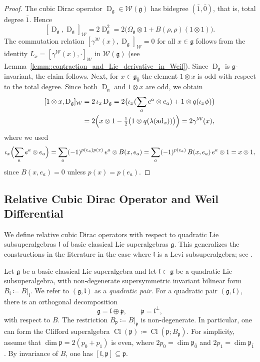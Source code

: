 \documentclass[11pt]{amsart}
\newcommand{\ad}{\operatorname{ad}}
\newcommand{\Dirac}{\operatorname{D}}
\def\WW{{\mathcal{W}}}
\def\Cl{{\operatorname{Cl}}}
\def\pp{{\mathfrak p}}
\def\ll{{\mathfrak l}}
\def\even{{\mathfrak{g}_{\bar{0}}}}
\def\pp{{\mathfrak p}}
\def\pp{{\mathfrak{p}}}
\def\gg{{\mathfrak{g}}}
\theoremstyle{plain}
\theoremstyle{remark}
\theoremstyle{definition}
\numberwithin{equation}{section}
\theoremstyle{remark}
\begin{document}
\begin{proof}
The cubic Dirac operator $\Dirac_{\gg}\in\mathcal{W}(\gg)$ has bidegree $(\bar{1},\bar{0})$, that is, total degree $\bar{1}$. Hence
\[
[\Dirac_{\gg},\Dirac_{\gg}]_{\WW}=2\Dirac_{\gg}^{2}
=2\bigl(\Omega_{\gg}\otimes1+B(\rho,\rho)(1\otimes1)\bigr).
\]
The commutation relation $[\gamma^{\mathcal{W}}(x),\Dirac_{\gg}]_{\WW}=0$ for all $x\in\gg$ follows from the identity
$
L_{x}=[\gamma^{\mathcal{W}}(x),\cdot]_{\WW}
$
in $\mathcal{W}(\gg)$ (see Lemma~\ref{lemm::contraction_and_Lie_derivative_in_Weil}). Since $\Dirac_{\gg}$ is $\gg$-invariant, the claim follows. Next, for $x\in\even$ the element $1\otimes x$ is odd with respect to the total degree. Since both $\Dirac_{\gg}$ and $1\otimes x$
are odd, we obtain
\[
\begin{split}
[1\otimes x,\Dirac_{\gg}]_{\WW}
&=2\,\iota_{x}\Dirac_{\gg}
=2\bigl(\iota_{x}(\sum_{a}e^{a}\otimes e_{a})+1\otimes q(\iota_{x}\phi)\bigr)\\
&=2\Bigl(x\otimes1-\tfrac{1}{2}\bigl(1\otimes q(\lambda(\ad_{x}))\bigr)\Bigr)
=2\gamma^{\WW}(x),
\end{split}
\]
where we used
\[
\iota_{x}\Bigl(\sum_{a}e^{a}\otimes e_{a}\Bigr)
=\sum_{a}(-1)^{p(e_{a})p(x)}\,e^{a}\otimes B(x,e_{a})
=\sum_{a}(-1)^{p(e_{a})}\,B(x,e_{a})\,e^{a}\otimes 1
=x\otimes 1,
\]
since $B(x,e_{a})=0$ unless $p(x)=p(e_{a})$.
\end{proof}

\subsection{Relative Cubic Dirac Operator and Weil Differential} \label{subsec::relative_Dirac}
We define relative cubic Dirac operators with respect to quadratic Lie subsuperalgebras $\ll$ of basic classical Lie superalgebras $\gg$. This generalizes the constructions in the literature in the case where $\ll$ is a Levi subsuperalgebra; see \cite{huang2005dirac,Schmidt_Noja}.

Let $\gg$ be a basic classical Lie superalgebra and let $\ll\subset \gg$
be a quadratic Lie subsuperalgebra, with non-degenerate supersymmetric invariant bilinear
form $B_{\ll}\coloneqq B|_{\ll}$. We refer to $(\gg,\ll)$ as a
\emph{quadratic pair}. For a quadratic pair $(\gg,\ll)$, there is an orthogonal decomposition
\begin{equation}
\gg=\ll\oplus\pp,\qquad \pp=\ll^{\perp},
\end{equation}
with respect to $B$. The restriction $B_{\pp}\coloneqq B|_{\pp}$ is non-degenerate. In particular, one can form the Clifford superalgebra $\Cl(\pp)\coloneqq \Cl(\pp;B_{\pp})$. For simplicity, assume that $\dim\pp=2(p_{0}+p_{1})$ is even, where $2p_{0}=\dim\pp_{\bar{0}}$ and $2p_{1}=\dim\pp_{\bar{1}}$. By invariance of $B$, one has $[\ll,\pp]\subseteq\pp$. 
\end{document}
